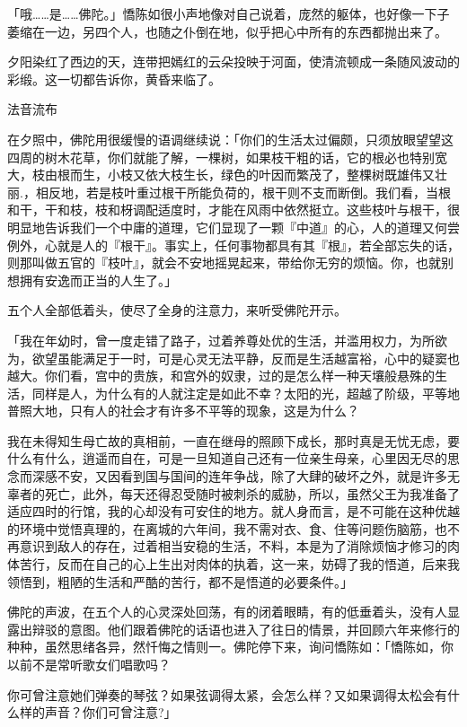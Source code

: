 \documentclass[12pt,twoside,openany]{book}
\begin{document}
「哦……是……佛陀。」憍陈如很小声地像对自己说着，庞然的躯体，也好像一下子萎缩在一边，另四个人，也随之仆倒在地，似乎把心中所有的东西都抛出来了。

夕阳染红了西边的天，连带把嫣红的云朵投映于河面，使清流顿成一条随风波动的彩缎。这一切都告诉你，黄昏来临了。

法音流布

在夕照中，佛陀用很缓慢的语调继续说：「你们的生活太过偏颇，只须放眼望望这四周的树木花草，你们就能了解，一棵树，如果枝干粗的话，它的根必也特别宽大，枝由根而生，小枝又依大枝生长，绿色的叶因而繁茂了，整棵树既雄伟又壮丽.，相反地，若是枝叶重过根干所能负荷的，根干则不支而断倒。我们看，当根和干，干和枝，枝和枒调配适度时，才能在风雨中依然挺立。这些枝叶与根干，很明显地告诉我们一个中庸的道理，它们显现了一颗『中道』的心，人的道理又何尝例外，心就是人的『根干』。事实上，任何事物都具有其『根』，若全部忘失的话，则那叫做五官的『枝叶』，就会不安地摇晃起来，带给你无穷的烦恼。你，也就别想拥有安逸而正当的人生了。」

五个人全部低着头，使尽了全身的注意力，来听受佛陀开示。

「我在年幼时，曾一度走错了路子，过着养尊处优的生活，并滥用权力，为所欲为，欲望虽能满足于一时，可是心灵无法平静，反而是生活越富裕，心中的疑窦也越大。你们看，宫中的贵族，和宫外的奴隶，过的是怎么样一种天壤般悬殊的生活，同样是人，为什么有的人就注定是如此不幸？太阳的光，超越了阶级，平等地普照大地，只有人的社会才有许多不平等的现象，这是为什么？

我在未得知生母亡故的真相前，一直在继母的照顾下成长，那时真是无忧无虑，要什么有什么，逍遥而自在，可是一旦知道自己还有一位亲生母亲，心里因无尽的思念而深感不安，又因看到国与国间的连年争战，除了大肆的破坏之外，就是许多无辜者的死亡，此外，每天还得忍受随时被刺杀的威胁，所以，虽然父王为我准备了适应四时的行馆，我的心却没有可安住的地方。就人身而言，是不可能在这种优越的环境中觉悟真理的，在离城的六年间，我不需对衣、食、住等问题伤脑筋，也不再意识到敌人的存在，过着相当安稳的生活，不料，本是为了消除烦恼才修习的肉体苦行，反而在自己的心上生出对肉体的执着，这一来，妨碍了我的悟道，后来我领悟到，粗陋的生活和严酷的苦行，都不是悟道的必要条件。」

佛陀的声波，在五个人的心灵深处回荡，有的闭着眼睛，有的低垂着头，没有人显露出辩驳的意图。他们跟着佛陀的话语也进入了往日的情景，并回顾六年来修行的种种，虽然思绪各异，然忏悔之情则一。佛陀停下来，询问憍陈如：「憍陈如，你以前不是常听歌女们唱歌吗？

你可曾注意她们弹奏的琴弦？如果弦调得太紧，会怎么样？又如果调得太松会有什么样的声音？你们可曾注意?」
\end{document}
